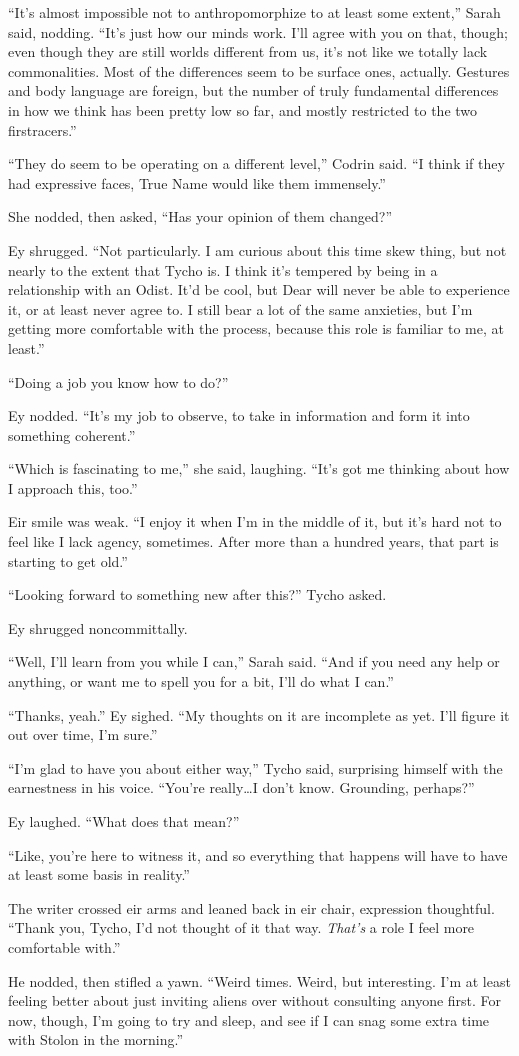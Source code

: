 ``It's almost impossible not to anthropomorphize to at least some extent,'' Sarah said, nodding. ``It's just how our minds work. I'll agree with you on that, though; even though they are still worlds different from us, it's not like we totally lack commonalities. Most of the differences seem to be surface ones, actually. Gestures and body language are foreign, but the number of truly fundamental differences in how we think has been pretty low so far, and mostly restricted to the two firstracers.''

``They do seem to be operating on a different level,'' Codrin said. ``I think if they had expressive faces, True Name would like them immensely.''

She nodded, then asked, ``Has your opinion of them changed?''

Ey shrugged. ``Not particularly. I am curious about this time skew thing, but not nearly to the extent that Tycho is. I think it's tempered by being in a relationship with an Odist. It'd be cool, but Dear will never be able to experience it, or at least never agree to. I still bear a lot of the same anxieties, but I'm getting more comfortable with the process, because this role is familiar to me, at least.''

``Doing a job you know how to do?''

Ey nodded. ``It's my job to observe, to take in information and form it into something coherent.''

``Which is fascinating to me,'' she said, laughing. ``It's got me thinking about how I approach this, too.''

Eir smile was weak. ``I enjoy it when I'm in the middle of it, but it's hard not to feel like I lack agency, sometimes. After more than a hundred years, that part is starting to get old.''

``Looking forward to something new after this?'' Tycho asked.

Ey shrugged noncommittally.

``Well, I'll learn from you while I can,'' Sarah said. ``And if you need any help or anything, or want me to spell you for a bit, I'll do what I can.''

``Thanks, yeah.'' Ey sighed. ``My thoughts on it are incomplete as yet. I'll figure it out over time, I'm sure.''

``I'm glad to have you about either way,'' Tycho said, surprising himself with the earnestness in his voice. ``You're really\ldots I don't know. Grounding, perhaps?''

Ey laughed. ``What does that mean?''

``Like, you're here to witness it, and so everything that happens will have to have at least some basis in reality.''

The writer crossed eir arms and leaned back in eir chair, expression thoughtful. ``Thank you, Tycho, I'd not thought of it that way. \emph{That's} a role I feel more comfortable with.''

He nodded, then stifled a yawn. ``Weird times. Weird, but interesting. I'm at least feeling better about just inviting aliens over without consulting anyone first. For now, though, I'm going to try and sleep, and see if I can snag some extra time with Stolon in the morning.''
